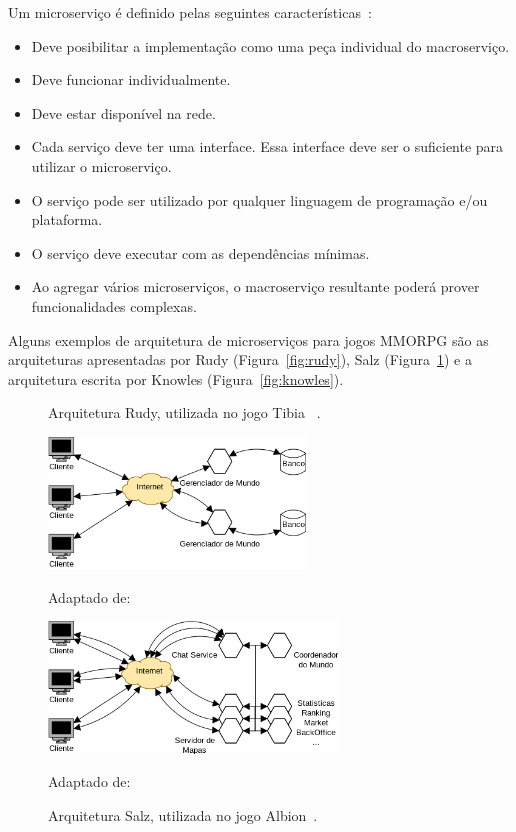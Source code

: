 Um microserviço é definido pelas seguintes características~\cite{8169955}:

\begin{itemize}
  \item Deve posibilitar a implementação como uma peça individual do macroserviço.
  \item Deve funcionar individualmente.
  \item Deve estar disponível na rede.
  \item Cada serviço deve ter uma interface. Essa interface deve ser o suficiente para utilizar o microserviço.
  \item O serviço pode ser utilizado por qualquer linguagem de programação e/ou plataforma.
  \item O serviço deve executar com as dependências mínimas.
  \item Ao agregar vários microserviços, o macroserviço resultante poderá prover funcionalidades complexas.
\end{itemize}

Alguns exemplos de arquitetura de microserviços para jogos \ac{MMORPG} são as arquiteturas apresentadas por Rudy (Figura~\ref{fig:rudy}), Salz (Figura~\ref{fig:salz}) e a arquitetura escrita por Knowles (Figura~\ref{fig:knowles}).

\begin{figure}[htb!]
  \begin{minipage}{.5\textwidth}
    \caption{Arquitetura Rudy, utilizada no jogo Tibia ~\cite{matthiasrudy2011}.}
    \label{fig:rudy}
    \includegraphics[height=3.5cm]{arquiteturas/rudy.png}
    \centering

    Adaptado de:~\cite{matthiasrudy2011}
  \end{minipage}
  \begin{minipage}{.5\textwidth}
    \caption{Arquitetura Salz, utilizada no jogo Albion~\cite{albion_online_unite}.}
    \label{fig:salz}
    \includegraphics[height=3.5cm]{arquiteturas/salz.png}
    \centering

    Adaptado de:~\cite{albion_online_unite}
  \end{minipage}%
\end{figure}

